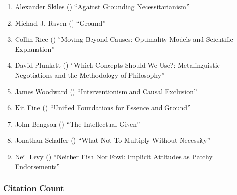 \documentclass[
  10pt,
  letterpaper,
  DIV=11,
  numbers=noendperiod,
  twoside]{scrartcl}
\providecommand{\tightlist}{%
  \setlength{\itemsep}{0pt}\setlength{\parskip}{0pt}}\usepackage{longtable,booktabs,array}
\begin{document}
\begin{enumerate}
\def\labelenumi{\arabic{enumi}.}
\tightlist
\item
  Alexander Skiles () ``Against
  Grounding Necessitarianism''
\item
  Michael J. Raven () ``Ground''
\item
  Collin Rice () ``Moving Beyond
  Causes: Optimality Models and Scientific Explanation''
\item
  David Plunkett () ``Which
  Concepts Should We Use?: Metalinguistic Negotiations and the
  Methodology of Philosophy''
\item
  James Woodward ()
  ``Interventionism and Causal Exclusion''
\item
  Kit Fine () ``Unified
  Foundations for Essence and Ground''
\item
  John Bengson () ``The
  Intellectual Given''
\item
  Jonathan Schaffer () ``What Not
  To Multiply Without Necessity''
\item
  Neil Levy () ``Neither Fish Nor
  Fowl: Implicit Attitudes as Patchy Endorsements''
\end{enumerate}

\subsubsection*{Citation Count}\label{sec-count-2015}
\end{document}
